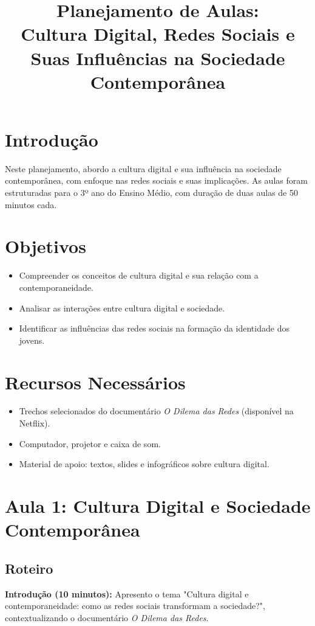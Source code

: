 \documentclass[a4paper,12pt]{article}
\title{Planejamento de Aulas: \\ Cultura Digital, Redes Sociais e Suas Influências na Sociedade Contemporânea}
\author{}
\date{}
\begin{document}
\maketitle

\section{Introdução}
Neste planejamento, abordo a cultura digital e sua influência na sociedade contemporânea, com enfoque nas redes sociais e suas implicações. As aulas foram estruturadas para o 3º ano do Ensino Médio, com duração de duas aulas de 50 minutos cada.

\section{Objetivos}
\begin{itemize}
    \item Compreender os conceitos de cultura digital e sua relação com a contemporaneidade.
    \item Analisar as interações entre cultura digital e sociedade.
    \item Identificar as influências das redes sociais na formação da identidade dos jovens.
\end{itemize}

\section{Recursos Necessários}
\begin{itemize}
    \item Trechos selecionados do documentário \textit{O Dilema das Redes} (disponível na Netflix).
    \item Computador, projetor e caixa de som.
    \item Material de apoio: textos, slides e infográficos sobre cultura digital.
\end{itemize}

\section{Aula 1: Cultura Digital e Sociedade Contemporânea}
\subsection{Roteiro}
\textbf{Introdução (10 minutos):} Apresento o tema "Cultura digital e contemporaneidade: como as redes sociais transformam a sociedade?", contextualizando o documentário \textit{O Dilema das Redes}.
\end{document}
